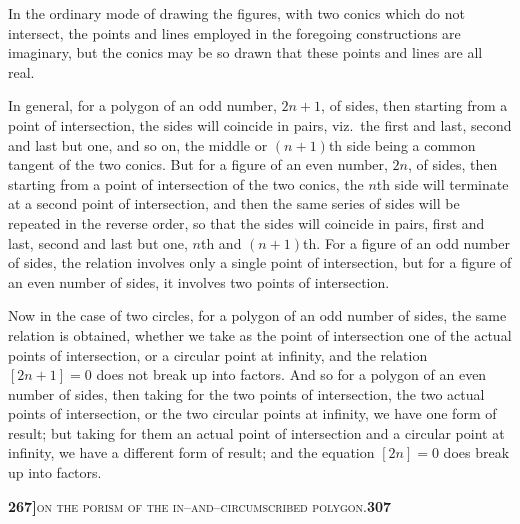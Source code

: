 \documentclass[11pt]{article}
\begin{document}
\medskip

\noindent In the ordinary mode of drawing the figures, with two conics which do not intersect, the points and lines employed in the foregoing constructions are imaginary, but the conics may be so drawn that these points and lines are all real.

\medskip

\noindent In general, for a polygon of an odd number, $2n+1$, of sides, then starting from a point of intersection, the sides will coincide in pairs, viz.\ the first and last, second and last but one, and so on, the middle or $(n+1)$th side being a common tangent of the two conics. But for a figure of an even number, $2n$, of sides, then starting from a point of intersection of the two conics, the $n$th side will terminate at a second point of intersection, and then the same series of sides will be repeated in the reverse order, so that the sides will coincide in pairs, first and last, second and last but one, $n$th and $(n+1)$th. For a figure of an odd number of sides, the relation involves only a single point of intersection, but for a figure of an even number of sides, it involves two points of intersection.

\medskip

\noindent Now in the case of two circles, for a polygon of an odd number of sides, the same relation is obtained, whether we take as the point of intersection one of the actual points of intersection, or a circular point at infinity, and the relation $[2n+1] = 0$ does not break up into factors. And so for a polygon of an even number of sides, then taking for the two points of intersection, the two actual points of intersection, or the two circular points at infinity, we have one form of result; but taking for them an actual point of intersection and a circular point at infinity, we have a different form of result; and the equation $[2n] = 0$ does break up into factors.

\newpage
\setcounter{page}{307}

\noindent\textbf{267]}\hfill\textsc{on the porism of the in--and--circumscribed polygon.}\hfill\textbf{307}

\medskip
\end{document}
